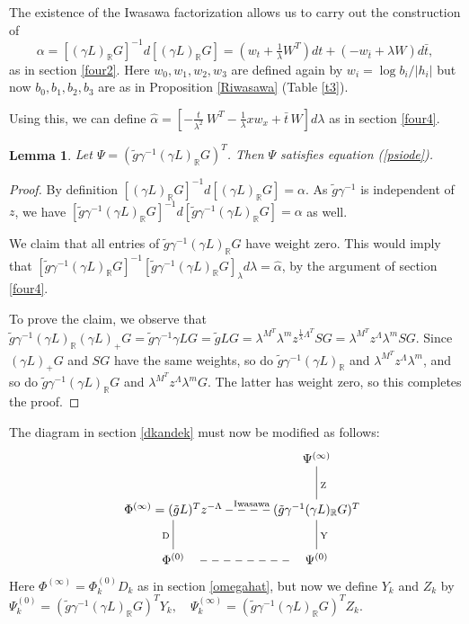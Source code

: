 \documentclass[a4paper,12pt,leqno]{amsart}
\numberwithin{equation}{section}
\theoremstyle{plain}
\newtheorem{lemma}[theorem]{Lemma}
\theoremstyle{definition}
\newcommand{\R}{\mathbb R}
\newcommand{\al}{\alpha}
\newcommand{\la}{\lambda}
\newcommand{\tbar}{  {\bar t}  }
\newcommand{\Psiz}{  \Psi^{(0)}  }
\newcommand{\Psii}{  \Psi^{(\infty)}  }
\newcommand{\Phiz}{\Phi^{(0)}}
\newcommand{\Phii}{\Phi^{(\infty)}}
\newcommand{\nn}{m}
\newcommand{\NN}{M}
\newcommand{\MM}{\Lambda}
\newcommand{\gazi}{\gamma}
\begin{document}
{The existence of the Iwasawa factorization allows
us to carry out the construction of 
\[
\al = [ (\gazi L)_\R G ]^{-1} d[(\gazi L)_\R  G ]=
(w_t+\tfrac1\la W^T)dt + (-w_{\tbar}+\la W)d\tbar,
\]
as in section \ref{four2}.   Here $w_0,w_1,w_2,w_3$ are defined again by $w_i=\log b_i/\vert h_i\vert$ but now $b_0,b_1,b_2,b_3$ are as in Proposition \ref{Riwasawa} (Table \ref{t3}).

Using this, we can define 
$
\hat\al=
\left[
- \tfrac{t}{\la^2}
\ W^T
- \tfrac1\la xw_x + \tbar \,W
\right]
d\la
$
as in section \ref{four4}.  

\begin{lemma} Let $\Psi=
(\tilde g \gazi^{-1} (\gazi L)_\R G)^T$.
Then
$\Psi$ satisfies equation (\ref{psiode}).
\end{lemma}

\begin{proof} By definition
$[ (\gazi L)_\R   G ]^{-1} d[(\gazi L)_\R   G ] = \al$.  
As $\tilde g \gazi^{-1}$ is independent of $z$, we have
$[ \tilde g \gazi^{-1} (\gazi L)_\R   G ]^{-1} d[\tilde g \gazi^{-1} (\gazi L)_\R   G ]= \al$ as well.  

We claim that all entries of $\tilde g \gazi^{-1} (\gazi L)_\R   G$ have weight zero.  This would imply that $[ \tilde g \gazi^{-1} (\gazi L)_\R   G ]^{-1} [\tilde g \gazi^{-1} (\gazi L)_\R   G ]_\la d\la = \hat\al$, by the argument of section \ref{four4}. 

To prove the claim, we observe that 
$\tilde g \gazi^{-1} (\gazi L)_\R   (\gazi L)_+ G =
\tilde g \gazi^{-1} \gazi  L G = \tilde g L G =
\la^{\NN^T} \la^\nn z^{\frac1\la \MM^T} S G = \la^{\NN^T}  z^\MM \la^\nn S G$.  Since 
$(\gazi L)_+ G$ and $S G$ have the same weights, so do 
$\tilde g \gazi^{-1} (\gazi L)_\R $ and $\la^{\NN^T}  z^\MM \la^\nn$, 
and so do $\tilde g \gazi^{-1} (\gazi L)_\R   G$ and 
$\la^{\NN^T}  z^\MM \la^\nn G$.  The latter has weight zero, so this completes the proof.
\end{proof} 

The diagram in section \ref{dkandek} must now be modified as follows:
\[
\xymatrix{
 \quad \quad \quad \quad \quad \quad \quad \quad\quad\quad
  &   \Psii\ar@{-}[d]^{\text{Z}}
\\
 \Phii = (\tilde gL)^Tz^{-\MM}\ar@{--}[r]^{\text{\ \ \ \  Iwasawa}}    &    (\tilde g \gazi^{-1} (\gazi L)_\R  G)^T
\\
 \quad \Phiz\ar@{-}[u]^{\text{D}}\ar@{--}[r]   \quad   &  \quad \Psiz\ar@{-}[u]_{\text{Y}}\quad
}
\]
Here $\Phii=\Phiz_k D_k$ as in section \ref{omegahat}, but now
we define $Y_k$ and $Z_k$ by
$\Psiz_k=(\tilde g \gazi^{-1} (\gazi L)_\R   G)^T Y_k,\quad 
\Psii_k=(\tilde g \gazi^{-1} (\gazi L)_\R   G)^T Z_k$.

}
\end{document}
